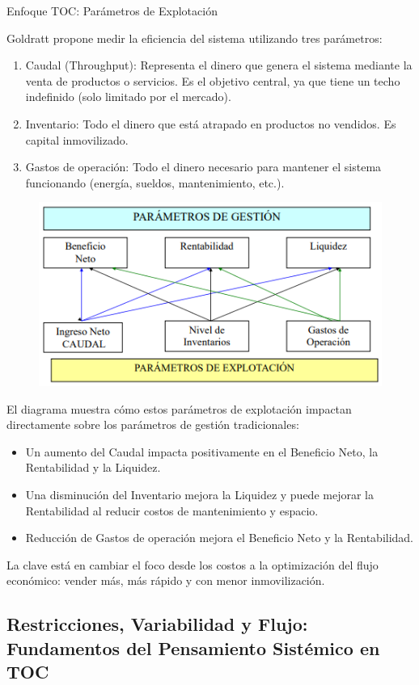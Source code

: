 \documentclass[a4paper,oneside,11pt]{article}
\begin{document}
Enfoque TOC: Parámetros de Explotación

Goldratt propone medir la eficiencia del sistema utilizando tres parámetros:

\begin{enumerate}
    \item Caudal (Throughput): Representa el dinero que genera el sistema mediante la venta de productos o servicios. Es el objetivo central, ya que tiene un techo indefinido (solo limitado por el mercado).
    \item Inventario: Todo el dinero que está atrapado en productos no vendidos. Es capital inmovilizado.
    \item Gastos de operación: Todo el dinero necesario para mantener el sistema funcionando (energía, sueldos, mantenimiento, etc.).
\end{enumerate}

\begin{figure} [ht!]
    \centering
    \includegraphics[width=0.5\linewidth]{parametros de explotacion.png}
\end{figure}

El diagrama muestra cómo estos parámetros de explotación impactan directamente sobre los parámetros de gestión tradicionales:

\begin{itemize}
    \item Un aumento del Caudal impacta positivamente en el Beneficio Neto, la Rentabilidad y la Liquidez.
    \item Una disminución del Inventario mejora la Liquidez y puede mejorar la Rentabilidad al reducir costos de mantenimiento y espacio.
    \item Reducción de Gastos de operación mejora el Beneficio Neto y la Rentabilidad.
\end{itemize}

La clave está en cambiar el foco desde los costos a la optimización del flujo económico: vender más, más rápido y con menor inmovilización.

\subsection{Restricciones, Variabilidad y Flujo: Fundamentos del Pensamiento Sistémico en TOC}
\end{document}
